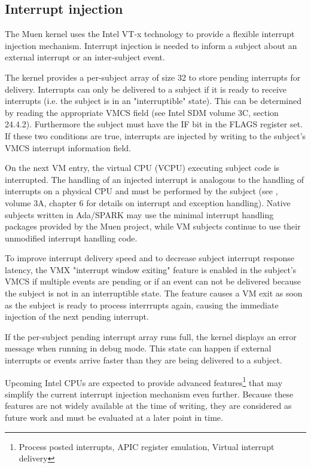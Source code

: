 \subsection{Interrupt injection}\label{subsec:int-injection}
The Muen kernel uses the Intel VT-x technology to provide a flexible interrupt
injection mechanism. Interrupt injection is needed to inform a subject about an
external interrupt or an inter-subject event.

The kernel provides a per-subject array of size 32 to store pending interrupts
for delivery.  Interrupts can only be delivered to a subject if it is ready to
receive interrupts (i.e. the subject is in an "interruptible" state). This can
be determined by reading the appropriate VMCS field (see Intel SDM
\cite{IntelSDM} volume 3C, section 24.4.2). Furthermore the subject must have
the IF bit in the FLAGS register set. If these two conditions are true,
interrupts are injected by writing to the subject's VMCS interrupt information
field.

On the next VM entry, the virtual CPU (VCPU) executing subject code
is interrupted. The handling of an injected interrupt is analogous to the
handling of interrupts on a physical CPU and must be performed by the subject
(see \cite{IntelSDM}, volume 3A, chapter 6 for details on interrupt and exception
 handling). Native subjects written in Ada/SPARK may use the minimal interrupt
handling packages provided by the Muen project, while VM subjects continue to
use their unmodified interrupt handling code.

To improve interrupt delivery speed and to decrease subject interrupt response
latency, the VMX "interrupt window exiting" feature is enabled in the subject's
VMCS if multiple events are pending or if an event can not be delivered because
the subject is not in an interruptible state. The feature causes a VM exit as
soon as the subject is ready to process interrrupts again, causing the immediate
injection of the next pending interrupt.

If the per-subject pending interrupt array runs full, the kernel displays an
error message when running in debug mode. This state can happen if external
interrupts or events arrive faster than they are being delivered to a subject.

Upcoming Intel CPUs are expected to provide advanced
features\footnote{Process posted interrupts, APIC register emulation, Virtual
interrupt delivery} that may simplify the current interrupt injection mechanism
even further. Because these features are not widely available at the time of
writing, they are considered as future work and must be evaluated at a later
point in time.
